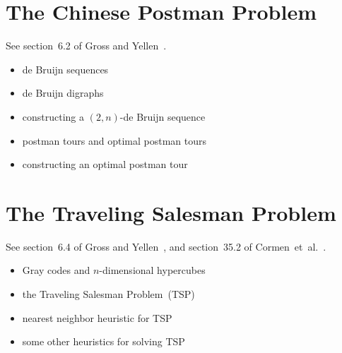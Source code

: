 
\section{The Chinese Postman Problem}

See section~6.2 of Gross and Yellen~\cite{GrossYellen1999}.

\begin{itemize}
\item de Bruijn sequences

\item de Bruijn digraphs

\item constructing a $(2, n)$-de Bruijn sequence

\item postman tours and optimal postman tours

\item constructing an optimal postman tour
\end{itemize}



\section{The Traveling Salesman Problem}

See section~6.4 of Gross and Yellen~\cite{GrossYellen1999}, and
section~35.2 of Cormen~et~al.~\cite{CormenEtAl2001}.

\begin{itemize}
\item Gray codes and $n$-dimensional hypercubes

\item the Traveling Salesman Problem~(TSP)

\item nearest neighbor heuristic for TSP

\item some other heuristics for solving TSP
\end{itemize}

